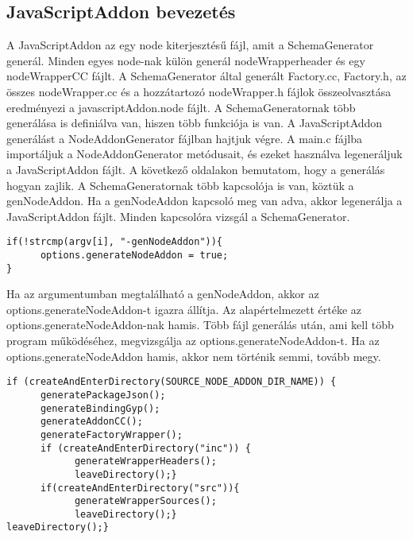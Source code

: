 \subsection{JavaScriptAddon bevezetés}\label{chap:javaScriptAddon_bevezetes}

\noindent

A JavaScriptAddon az egy node kiterjesztésű fájl, amit a SchemaGenerator generál. Minden egyes node-nak külön generál nodeWrapperheader és egy nodeWrapperCC fájlt.
A SchemaGenerator által generált Factory.cc, Factory.h, az összes nodeWrapper.cc és a hozzátartozó nodeWrapper.h fájlok összeolvasztása eredményezi a javascriptAddon.node fájlt.
A SchemaGeneratornak több generálása is definiálva van, hiszen több funkciója is van.
A JavaScriptAddon generálást a NodeAddonGenerator fájlban hajtjuk végre.
A main.c fájlba importáljuk a NodeAddonGenerator metódusait, és ezeket használva legeneráljuk a JavaScriptAddon fájlt.
A következő oldalakon bemutatom, hogy a generálás hogyan zajlik.
A SchemaGeneratornak több kapcsolója is van, köztük a genNodeAddon.
Ha a genNodeAddon kapcsoló meg van adva, akkor legenerálja a JavaScriptAddon fájlt.
Minden kapcsolóra vizsgál a SchemaGenerator.

\begin{lstlisting}[caption={SchemaGenerator kapcsoló vizsgálás},label={lst:schemagenerator_argv_genNodeAddon}, language={CStyle}]
if(!strcmp(argv[i], "-genNodeAddon")){
      options.generateNodeAddon = true;
}
\end{lstlisting}

Ha az argumentumban megtalálható a genNodeAddon, akkor az options.generateNodeAddon-t igazra állítja.
Az alapértelmezett értéke az options.generateNodeAddon-nak hamis.
Több fájl generálás után, ami kell több program működéséhez, megvizsgálja az options.generateNodeAddon-t.
Ha az options.generateNodeAddon hamis, akkor nem történik semmi, tovább megy.

\begin{lstlisting}[caption={SchemaGenerator JavaScriptAddon generálás},label={lst:schemagenerator_genNodeAddon_check}, language={CStyle}]
if (createAndEnterDirectory(SOURCE_NODE_ADDON_DIR_NAME)) {
      generatePackageJson();
      generateBindingGyp();
      generateAddonCC();
      generateFactoryWrapper();
      if (createAndEnterDirectory("inc")) {
            generateWrapperHeaders();
            leaveDirectory();}
      if(createAndEnterDirectory("src")){
            generateWrapperSources();
            leaveDirectory();}
leaveDirectory();}
\end{lstlisting}

